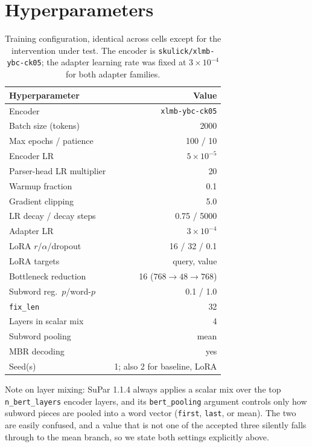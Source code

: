 \documentclass[11pt]{article}
\begin{document}
\section{Hyperparameters}
\label{app:hyper}
\begin{table}[h]
\centering
\footnotesize
\setlength{\tabcolsep}{4pt}
\begin{tabular}{@{}lr@{}}
\toprule
\textbf{Hyperparameter} & \textbf{Value} \\
\midrule
Encoder & \texttt{xlmb-ybc-ck05} \\
Batch size (tokens)        & 2000 \\
Max epochs / patience      & 100 / 10 \\
Encoder LR                 & $5\times10^{-5}$ \\
Parser-head LR multiplier  & 20 \\
Warmup fraction            & 0.1 \\
Gradient clipping          & 5.0 \\
LR decay / decay steps     & 0.75 / 5000 \\
Adapter LR                 & $3\times10^{-4}$ \\
LoRA $r$/$\alpha$/dropout   & 16 / 32 / 0.1 \\
LoRA targets               & query, value \\
Bottleneck reduction       & 16 ($768\!\to\!48\!\to\!768$) \\
Subword reg.\ $p$/word-$p$  & 0.1 / 1.0 \\
\texttt{fix\_len}          & 32 \\
Layers in scalar mix       & 4 \\
Subword pooling            & mean \\
MBR decoding               & yes \\
Seed(s)                    & 1; also 2 for baseline, LoRA \\
\bottomrule
\end{tabular}
\caption{Training configuration, identical across cells except for the
intervention under test. The encoder is \texttt{skulick/xlmb-ybc-ck05}; the
adapter learning rate was fixed at $3\times10^{-4}$ for both adapter
families.}
\end{table}

Note on layer mixing: SuPar 1.1.4 always applies a scalar mix over the top
\texttt{n\_bert\_layers} encoder layers, and its \texttt{bert\_pooling} argument
controls only how subword pieces are pooled into a word vector
(\texttt{first}, \texttt{last}, or mean). The two are easily confused, and a
value that is not one of the accepted three silently falls through to the mean
branch, so we state both settings explicitly above.
\end{document}
